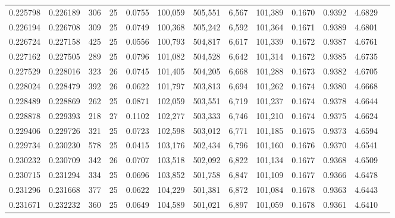\begin{tabular}{rrrrrrrrrrrrr}
0.225798 & 0.226189 &   306 &  25 &                                     0.0755 & 100,059 & 505,551 &   6,567 & 101,389 & 0.1670 & 0.9392 & 4.6829 \\
0.226194 & 0.226708 &   309 &  25 &                                     0.0749 & 100,368 & 505,242 &   6,592 & 101,364 & 0.1671 & 0.9389 & 4.6801 \\
0.226724 & 0.227158 &   425 &  25 &                                     0.0556 & 100,793 & 504,817 &   6,617 & 101,339 & 0.1672 & 0.9387 & 4.6761 \\
0.227162 & 0.227505 &   289 &  25 &                                     0.0796 & 101,082 & 504,528 &   6,642 & 101,314 & 0.1672 & 0.9385 & 4.6735 \\
0.227529 & 0.228016 &   323 &  26 &                                     0.0745 & 101,405 & 504,205 &   6,668 & 101,288 & 0.1673 & 0.9382 & 4.6705 \\
0.228024 & 0.228479 &   392 &  26 &                                     0.0622 & 101,797 & 503,813 &   6,694 & 101,262 & 0.1674 & 0.9380 & 4.6668 \\
0.228489 & 0.228869 &   262 &  25 &                                     0.0871 & 102,059 & 503,551 &   6,719 & 101,237 & 0.1674 & 0.9378 & 4.6644 \\
0.228878 & 0.229393 &   218 &  27 &                                     0.1102 & 102,277 & 503,333 &   6,746 & 101,210 & 0.1674 & 0.9375 & 4.6624 \\
0.229406 & 0.229726 &   321 &  25 &                                     0.0723 & 102,598 & 503,012 &   6,771 & 101,185 & 0.1675 & 0.9373 & 4.6594 \\
0.229734 & 0.230230 &   578 &  25 &                                     0.0415 & 103,176 & 502,434 &   6,796 & 101,160 & 0.1676 & 0.9370 & 4.6541 \\
0.230232 & 0.230709 &   342 &  26 &                                     0.0707 & 103,518 & 502,092 &   6,822 & 101,134 & 0.1677 & 0.9368 & 4.6509 \\
0.230715 & 0.231294 &   334 &  25 &                                     0.0696 & 103,852 & 501,758 &   6,847 & 101,109 & 0.1677 & 0.9366 & 4.6478 \\
0.231296 & 0.231668 &   377 &  25 &                                     0.0622 & 104,229 & 501,381 &   6,872 & 101,084 & 0.1678 & 0.9363 & 4.6443 \\
0.231671 & 0.232232 &   360 &  25 &                                     0.0649 & 104,589 & 501,021 &   6,897 & 101,059 & 0.1678 & 0.9361 & 4.6410 \\

\end{tabular}
